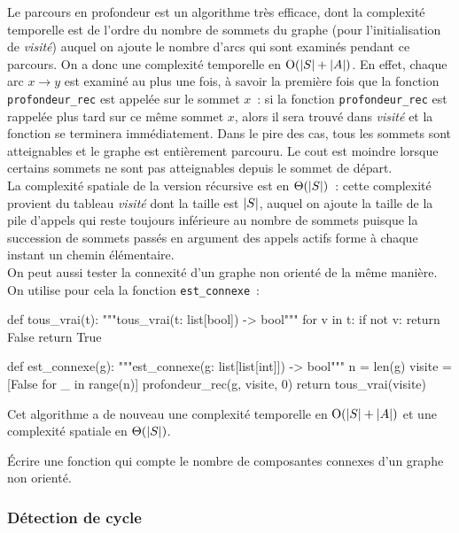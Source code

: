 \documentclass{magnolia}
\begin{document}
\noindent
Le parcours en profondeur 
est un algorithme très efficace, dont la complexité
temporelle est de l'ordre du nombre de sommets du graphe (pour l'initialisation de \emph{visité})
auquel on ajoute le nombre d'arcs qui sont examinés pendant ce parcours. On a donc une
complexité temporelle 
en ${\rm O}(\left|S\right|+\left|A\right|)$. En effet, chaque arc
$x\to y$ est examiné au plus une fois, à savoir la première fois que la fonction
\verb!profondeur_rec! est appelée sur le sommet $x$~: si la fonction
\verb!profondeur_rec! est rappelée plus tard sur ce même sommet $x$, alors il
sera trouvé dans \emph{visité} et la fonction se terminera immédiatement. Dans le pire des cas, tous les sommets sont atteignables et le graphe
est entièrement parcouru. Le cout est moindre lorsque certains sommets ne sont pas atteignables
depuis le sommet de départ.\\

La complexité spatiale de la version récursive est en $\Theta(\left|S\right|)$~: cette
complexité provient du tableau \emph{visité} dont
la taille est $\left|S\right|$, auquel on ajoute la taille de la pile
d'appels qui reste toujours inférieure au nombre de sommets puisque la succession de
sommets passés en argument des appels actifs forme à
chaque instant un chemin élémentaire.\\

On peut aussi tester la connexité d'un graphe non orienté de la même manière. On utilise pour
cela la fonction \verb!est_connexe!~:
\begin{pythoncodeline}
def tous_vrai(t):
    """tous_vrai(t: list[bool]) -> bool"""
    for v in t:
        if not v:
            return False
    return True

def est_connexe(g):
    """est_connexe(g: list[list[int]]) -> bool"""
    n = len(g)
    visite = [False for _ in range(n)]
    profondeur_rec(g, visite, 0)
    return tous_vrai(visite)
\end{pythoncodeline}
\noindent
Cet algorithme a de nouveau une complexité temporelle en ${\rm O}(\left|S\right|+\left|A\right|)$ et
une complexité spatiale en $\Theta(\left|S\right|)$.

\begin{exoUnique}
\exo Écrire une fonction qui compte le nombre de composantes connexes d'un graphe non
  orienté.
\end{exoUnique}

\subsubsection{Détection de cycle}
\end{document}
